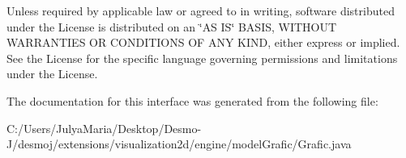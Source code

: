 Unless required by applicable law or agreed to in writing, software distributed under the License is distributed on an \char`\"{}\-A\-S I\-S\char`\"{} B\-A\-S\-I\-S, W\-I\-T\-H\-O\-U\-T W\-A\-R\-R\-A\-N\-T\-I\-E\-S O\-R C\-O\-N\-D\-I\-T\-I\-O\-N\-S O\-F A\-N\-Y K\-I\-N\-D, either express or implied. See the License for the specific language governing permissions and limitations under the License. 

The documentation for this interface was generated from the following file\-:\begin{DoxyCompactItemize}
\item 
C\-:/\-Users/\-Julya\-Maria/\-Desktop/\-Desmo-\/\-J/desmoj/extensions/visualization2d/engine/model\-Grafic/Grafic.\-java\end{DoxyCompactItemize}
